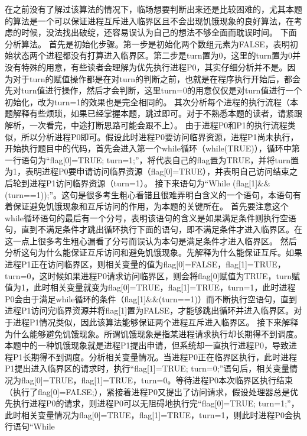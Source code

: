 \begin{solution}在之前没有了解过该算法的情况下，临场想要判断出来还是比较困难的，尤其本题的算法是一个可以保证进程互斥进入临界区且不会出现饥饿现象的良好算法，在考虑的时候，没法找出破绽，还容易误认为自己的想法不够全面而耽误时间。
下面分析算法。
首先是初始化步骤。第一步是初始化两个数组元素为FALSE，表明初始状态两个进程都没有打算进入临界区。第二步是turn置为0，这里的turn置为0并没有特殊的用意，有些读者会理解为优先执行进程P0，其实仔细分析并不是。因为对于turn的赋值操作都是在对turn的判断之前，也就是在程序执行开始后，都会先对turn值进行操作，然后才会判断，这里turn=0的用意仅仅是对turn值进行一个初始化，改为turn=1的效果也是完全相同的。
其次分析每个进程的执行流程（本题解释有些烦琐，如果已经掌握本题，跳过即可。对于不熟悉本题的读者，请紧跟解析，一次看完，中途打断思路可能会跟不上）。
由于进程P0和P1的执行流程类似，所以分析进程P0即可。假设此时进程P0要访问临界资源，进程P1尚未执行，开始执行题目中的代码，首先会进入第一个while循环（while(TRUE)），循环中第一行语句为``flag{[}0{]}=TRUE;
turn=1;''，将代表自己的flag置为TRUE，并将turn置为1，表明进程P0要申请访问临界资源（flag{[}0{]}=TRUE），并表明自己访问结束之后轮到进程P1访问临界资源（turn=1）。
接下来语句为``While
(flag{[}1{]}\&\&(turn==1));''。这句是很多考生粗心看错且很难弄明白含义的一个语句，本语句有着保证避免饥饿现象和互斥访问的作用，为本题的关键所在。
首先要注意这个while循环语句的最后有一个分号，表明该语句的含义是如果满足条件则执行空语句，直到不满足条件才跳出循环执行下面的语句，即不满足条件才进入临界区。在这一点上很多考生粗心漏看了分号而误认为本句是满足条件才进入临界区。
然后分析这句为什么能保证互斥访问和避免饥饿现象。先解释为什么能保证互斥。如果进程P1正在访问临界区，则相关变量的值为flag{[}0{]}=FALSE，flag{[}1{]}=TRUE，turn=0，这时候如果进程P0请求访问临界区，则会将flag{[}0{]}赋值为TRUE，turn赋值为1，此时相关变量就变为flag{[}0{]}=TRUE，flag{[}1{]}=TRUE，turn=1，此时进程P0会由于满足while循环的条件（flag{[}1{]}\&\&(turn==1)）而不断执行空语句，直到进程P1访问完临界资源并将flag{[}1{]}置为FALSE，才能够跳出循环并进入临界区。对于进程P1情况类似，因此该算法能够保证两个进程互斥进入临界区。
接下来解释为什么能够避免饥饿现象。所谓饥饿现象是指某进程请求执行却长期得不到调度。本题中的一种饥饿现象就是进程P1提出申请，但系统却一直执行进程P0，导致进程P1长期得不到调度。分析相关变量情况。当进程P0正在临界区执行，此时进程P1提出进入临界区的请求时，执行``flag{[}1{]}=TRUE;
turn=0;''语句后，相关变量情况为flag{[}0{]}=TRUE，flag{[}1{]}=TRUE，turn=0。等待进程P0本次临界区执行结束（执行了flag{[}0{]}=FALSE;），紧接着进程P0又提出了访问请求，假设处理器总是优先执行进程P0的请求，则进程P0可以无阻碍地执行完``flag{[}0{]}=TRUE;
turn=1;''，此时相关变量情况为flag{[}0{]}=TRUE，flag{[}1{]}=TRUE，turn=1，则此时进程P0会执行语句``While

\end{solution}
